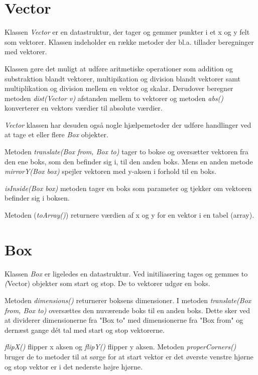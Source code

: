 \section{Vector}

Klassen \emph{Vector} er en datastruktur, der tager og gemmer punkter i et x og y felt som vektorer.  Klassen indeholder en række metoder der bl.a. tillader beregninger med vektorer. 

Klassen gøre det muligt at udføre aritmetiske operationer som addition og substraktion blandt vektorer, multipikation og division blandt vektorer samt multiplikation og division mellem en vektor og skalar. Derudover beregner metoden \emph{dist(Vector v)} afstanden mellem to vektorer og metoden \emph{abs()} konverterer en vektors værdier til absolute værdier. 

\emph{Vector} klassen har desuden også nogle hjælpemetoder der udføre handlinger ved at tage et eller flere \emph{Box} objekter. 

Metoden \emph{translate(Box from, Box to)} tager to bokse og oversætter vektoren fra den ene boks, som den befinder sig i, til den anden boks. Mens en anden metode \emph{mirrorY(Box box)} spejler vektoren med y-aksen i forhold til en boks. 

\emph{isInside(Box box)} metoden tager en boks som parameter og tjekker om vektoren befinder sig i boksen.  

Metoden (\emph{toArray()}) returnere værdien af x og y for en vektor i en tabel (array).


\section{Box}

Klassen \emph{Box} er ligeledes en datastruktur. Ved initiliasering tages og gemmes to \emph(Vector) objekter som start og stop. De to vektorer udgør en boks.

Metoden \emph{dimensions()} returnerer boksens dimensioner. I metoden \emph{translate(Box from, Box to)} oversættes den nuværende boks til en anden boks. Dette sker ved at dividerer dimensionerne fra "Box to" med dimensionerne fra "Box from" og dernæst gange dét tal med start og stop vektorerne.

\emph{flipX()} flipper x aksen og \emph{flipY()} flipper y aksen. Metoden \emph{properCorners()} bruger de to metoder til at sørge for at start vektor er det øverste venstre hjørne og stop vektor er i det nederste højre hjørne.

